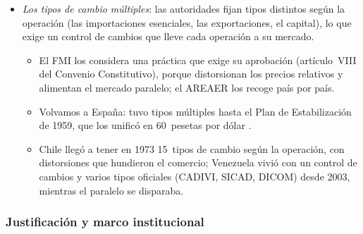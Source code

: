 \documentclass[11pt]{article}
\begin{document}
\begin{itemize}
\begin{itemize}
  \item el  chileno (1991-1998): un depósito sin remunerar en el banco central de una parte de cada entrada de capital (el 20~\% al principio, el 30~\% después) durante un año. Equivale a un impuesto tanto mayor cuanto más corto es el plazo de la entrada.
  \end{itemize}
\item \emph{Los tipos de cambio múltiples}: las autoridades fijan tipos distintos según la operación (las importaciones esenciales, las exportaciones, el capital), lo que exige un control de cambios que lleve cada operación a su mercado.
  \begin{itemize}
  \item El FMI los considera una práctica que exige su aprobación (artículo~VIII del Convenio Constitutivo), porque distorsionan los precios relativos y alimentan el mercado paralelo; el AREAER los recoge país por país\nocite{FMI2024AREAER2023}.
  \item Volvamos a España: tuvo tipos múltiples hasta el Plan de Estabilización de 1959, que los unificó en 60~pesetas por dólar .
  \item Chile llegó a tener en 1973 15~tipos de cambio según la operación, con distorsiones que hundieron el comercio\nocite{Hudson1994Chile}; Venezuela vivió con un control de cambios y varios tipos oficiales (CADIVI, SICAD, DICOM) desde 2003, mientras el paralelo se disparaba.
  \end{itemize}
\end{itemize}

\subsubsection{Justificación y marco institucional}\label{sec:controles-justificacion}
\end{document}
